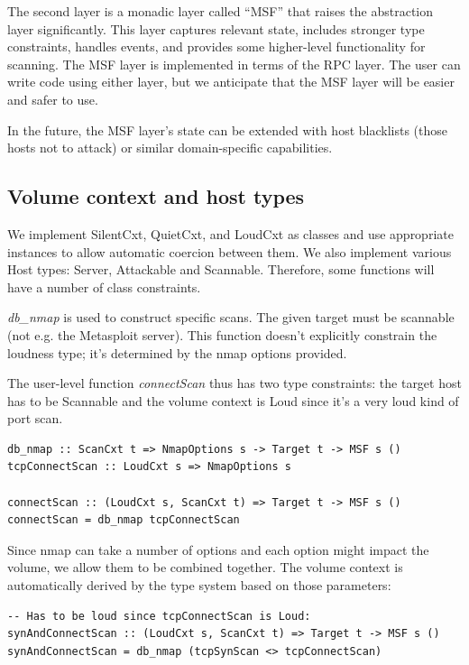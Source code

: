 \documentclass[figure,letterpaper,onefignum]{mysiam}
\begin{document}
The second layer is a monadic layer called ``MSF'' that raises the abstraction layer significantly. This layer captures relevant state, includes stronger type constraints, handles events, and provides some higher-level functionality for scanning. The MSF layer is implemented in terms of the RPC layer. The user can write code using either layer, but we anticipate that the MSF layer will be easier and safer to use.

In the future, the MSF layer's state can be extended with host blacklists (those hosts not to attack) or similar domain-specific capabilities.

\subsection{Volume context and host types}
We implement SilentCxt, QuietCxt, and LoudCxt as classes and use appropriate instances to allow automatic coercion between them. We also implement various Host types: Server, Attackable and Scannable. Therefore, some functions will have a number of class constraints.

\emph{db\_nmap} is used to construct specific scans. The given target must be scannable (not e.g. the Metasploit server). This function doesn't explicitly constrain the loudness type; it's determined by the nmap options provided.

The user-level function \emph{connectScan} thus has two type constraints: the target host has to be Scannable and the volume context is Loud since it's a very loud kind of port scan.

\begin{verbatim}
db_nmap :: ScanCxt t => NmapOptions s -> Target t -> MSF s ()
tcpConnectScan :: LoudCxt s => NmapOptions s

connectScan :: (LoudCxt s, ScanCxt t) => Target t -> MSF s ()
connectScan = db_nmap tcpConnectScan
\end{verbatim}

Since nmap can take a number of options and each option might impact the volume, we allow them to be combined together. The volume context is automatically derived by the type system based on those parameters:

\begin{verbatim}
-- Has to be loud since tcpConnectScan is Loud:
synAndConnectScan :: (LoudCxt s, ScanCxt t) => Target t -> MSF s ()
synAndConnectScan = db_nmap (tcpSynScan <> tcpConnectScan)
\end{verbatim}
\end{document}
